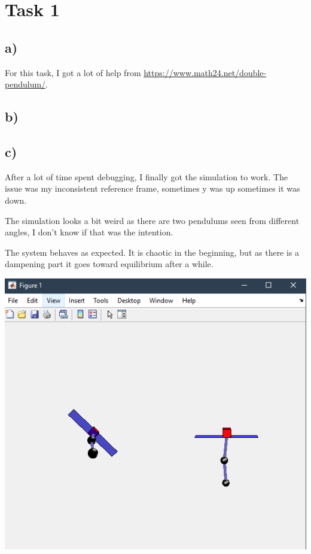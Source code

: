 \documentclass{article}
\begin{document}
\section*{Task 1}
\subsection*{a)}
For this task, I got a lot of help from \url{https://www.math24.net/double-pendulum/}.


\subsection*{b)}

\subsection*{c)}
After a lot of time spent debugging, I finally got the simulation to work.
The issue was my inconsistent reference frame, sometimes y was up sometimes it was down.

The simulation looks a bit weird as there are two pendulums seen from different angles,
I don't know if that was the intention.

The system behaves as expected. It is chaotic in the beginning,
but as there is a dampening part it goes toward equilibrium after a while.

\includegraphics{task_1_simulation.png}
\end{document}
